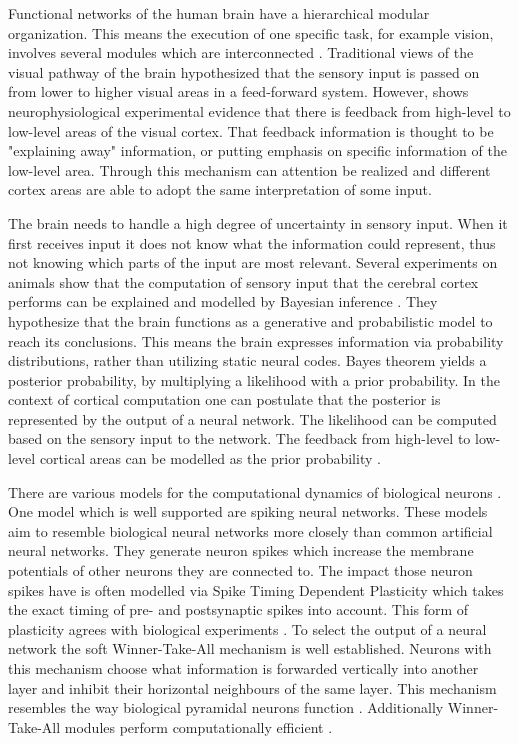 Functional networks of the human brain have a hierarchical modular organization. This means the execution of one specific task, for example vision, involves several modules which are interconnected  \citep{hierarchicalBrain}. Traditional views of the visual pathway of the brain hypothesized that the sensory input is passed on from lower to higher visual areas in a feed-forward system. However, \citet{HierachicalBayesVisualCortex} shows  neurophysiological experimental evidence that there is feedback from high-level to low-level areas of the visual cortex. That feedback information is thought to be "explaining away" information, or putting emphasis on specific information of the low-level area. Through this mechanism can attention be realized and different cortex areas are able to adopt the same interpretation of some input.
 
The brain needs to handle a high degree of uncertainty in sensory input. When it first receives input it does not know what the information could represent, thus not knowing which parts of the input are most relevant. Several experiments on animals show that the computation of sensory input that the cerebral cortex performs can be explained and modelled by Bayesian inference \citep{neuralSubstrate, HierachicalBayesVisualCortex, anatomyOfInference}. They hypothesize that the brain functions as a generative and probabilistic model to reach its conclusions. This means the brain expresses information via probability distributions, rather than utilizing static neural codes. Bayes theorem yields a posterior probability, by multiplying a likelihood with a prior probability. In the context of cortical computation one can postulate that the posterior is represented by the output of a neural network. The likelihood can be computed based on the sensory input to the network. The feedback from high-level to low-level cortical areas can be modelled as the prior probability \citep{nessler}.

There are various models for the computational dynamics of biological neurons \citep{SpikingNeuronModelsBook}. One model which is well supported are spiking neural networks. These models aim to resemble biological neural networks more closely than common artificial neural networks. They generate neuron spikes which increase the membrane potentials of other neurons they are connected to. The impact those neuron spikes have is often modelled via Spike Timing Dependent Plasticity which takes the exact timing of pre- and postsynaptic spikes into account. This form of plasticity agrees with biological experiments \citep{STDPFELDMAN, STDPDAN}. To select the output of a neural network the soft Winner-Take-All mechanism is well established. Neurons with this mechanism choose what information is forwarded vertically into another layer and inhibit their horizontal neighbours of the same layer.  This mechanism resembles the way biological pyramidal neurons function \citep{softWTA}. Additionally Winner-Take-All modules perform computationally efficient \citep{WTAPower}.

